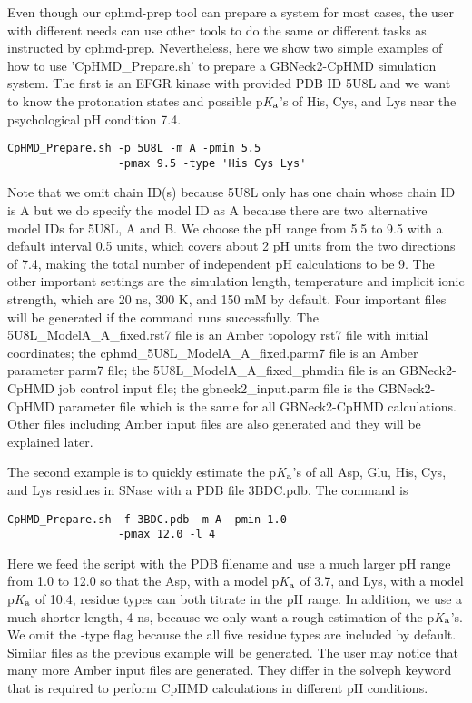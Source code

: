 \documentclass[9pt,tutorial]{livecoms}
\newcommand{\pka}{p\textit{K}$_{\rm a}$}
\begin{document}
Even though our cphmd-prep tool can prepare a system for most cases, the user with different needs can use other tools to do the same or different tasks as instructed by cphmd-prep. Nevertheless, here we show two simple examples of how to use 'CpHMD\_Prepare.sh' to prepare a GBNeck2-CpHMD simulation system. The first is an EFGR kinase with provided PDB ID 5U8L and we want to know the protonation states and possible {\pka's} of His, Cys, and Lys near the psychological pH condition 7.4. 
%
\begin{lstlisting}
CpHMD_Prepare.sh -p 5U8L -m A -pmin 5.5
                 -pmax 9.5 -type 'His Cys Lys'
\end{lstlisting}
%
Note that we omit chain ID(s) because 5U8L only has one chain whose chain ID is A but we do specify the model ID as A because there are two alternative model IDs for 5U8L, A and B. We choose the pH range from 5.5 to 9.5 with a default interval 0.5 units, which covers about 2 pH units from the two directions of 7.4, making the total number of independent pH calculations to be 9. The other important settings are the simulation length, temperature and implicit ionic strength, which are 20 ns, 300 K, and 150 mM by default. Four important files will be generated if the command runs successfully. The 5U8L\_ModelA\_A\_fixed.rst7 file is an Amber topology rst7 file with initial coordinates; the cphmd\_5U8L\_ModelA\_A\_fixed.parm7 file is an Amber parameter parm7 file; the 5U8L\_ModelA\_A\_fixed\_phmdin file is an GBNeck2-CpHMD job control input file; the gbneck2\_input.parm file is the GBNeck2-CpHMD parameter file which is the same for all GBNeck2-CpHMD calculations. Other files including Amber input files are also generated and they will be explained later.

The second example is to quickly estimate the {\pka's} of all Asp, Glu, His, Cys, and Lys residues in SNase with a PDB file 3BDC.pdb. The command is
%
\begin{lstlisting}
CpHMD_Prepare.sh -f 3BDC.pdb -m A -pmin 1.0 
                 -pmax 12.0 -l 4
\end{lstlisting}
%
Here we feed the script with the PDB filename and use a much larger pH range from 1.0 to 12.0 so that the Asp, with a model {\pka} of 3.7, and Lys, with a model {\pka} of 10.4, residue types can both titrate in the pH range. In addition, we use a much shorter length, 4 ns, because we only want a rough estimation of the {\pka's}. We omit the -type flag because the all five residue types are included by default. Similar files as the previous example will be generated. The user may notice that many more Amber input files are generated. They differ in the solveph keyword that is required to perform CpHMD calculations in different pH conditions.
\end{document}
